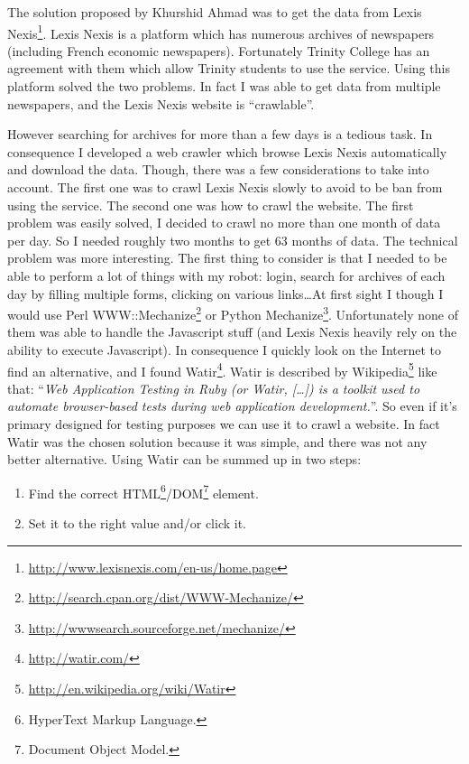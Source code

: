 \documentclass[12pt]{report}
\begin{document}
			The solution proposed by Khurshid Ahmad was to get the data from Lexis Nexis\footnote{\url{http://www.lexisnexis.com/en-us/home.page}}. Lexis Nexis is a platform which has numerous archives of newspapers (including French economic newspapers). Fortunately Trinity College has an agreement with them which allow Trinity students to use the service. Using this platform solved the two problems. In fact I was able to get data from multiple newspapers, and the Lexis Nexis website is ``crawlable''.
			
			However searching for archives for more than a few days is a tedious task. In consequence I developed a web crawler which browse Lexis Nexis automatically and download the data. Though, there was a few considerations to take into account. The first one was to crawl Lexis Nexis slowly to avoid to be ban from using the service. The second one was how to crawl the website. The first problem was easily solved, I decided to crawl no more than one month of data per day. So I needed roughly two months to get 63 months of data. The technical problem was more interesting. The first thing to consider is that I needed to be able to perform a lot of things with my robot: login, search for archives of each day by filling multiple forms, clicking on various links\ldots At first sight I though I would use Perl WWW::Mechanize\footnote{\url{http://search.cpan.org/dist/WWW-Mechanize/}} or Python Mechanize\footnote{\url{http://wwwsearch.sourceforge.net/mechanize/}}. Unfortunately none of them was able to handle the Javascript stuff (and Lexis Nexis heavily rely on the ability to execute Javascript). In consequence I quickly look on the Internet to find an alternative, and I found Watir\footnote{\url{http://watir.com/}}. Watir is described by Wikipedia\footnote{\url{http://en.wikipedia.org/wiki/Watir}} like that: ``\emph{Web Application Testing in Ruby (or Watir, [\ldots]) is a toolkit used to automate browser-based tests during web application development.}''. So even if it's primary designed for testing purposes we can use it to crawl a website. In fact Watir was the chosen solution because it was simple, and there was not any better alternative. Using Watir can be summed up in two steps:
			\begin{enumerate}
				\item Find the correct HTML\footnote{HyperText Markup Language.}/DOM\footnote{Document Object Model.} element.
				\item Set it to the right value and/or click it.
			\end{enumerate}
			
\end{document}
